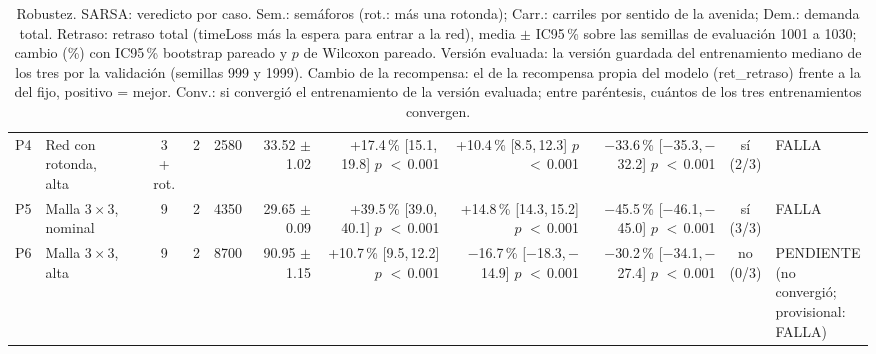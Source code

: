 \begin{table}[H]
\begin{tabular}{llcrrrrrrcl}
P4 & \makecell[l]{Red con\\{}rotonda,\\{}alta} & \makecell[c]{3\\{}+ rot.} & 2 & 2580 & \makecell[r]{33.52\\{}$\pm$ 1.02} & \makecell[r]{+17.4\,\%\\{}[15.1,\,19.8]\\$p$ $<$\,0.001} & \makecell[r]{+10.4\,\%\\{}[8.5,\,12.3]\\$p$ $<$\,0.001} & \makecell[r]{$-$33.6\,\%\\{}[$-$35.3,\,$-$32.2]\\$p$ $<$\,0.001} & \makecell[c]{sí\\{}(2/3)} & FALLA \\
P5 & \makecell[l]{Malla $3 \times 3$,\\{}nominal} & 9 & 2 & 4350 & \makecell[r]{29.65\\{}$\pm$ 0.09} & \makecell[r]{+39.5\,\%\\{}[39.0,\,40.1]\\$p$ $<$\,0.001} & \makecell[r]{+14.8\,\%\\{}[14.3,\,15.2]\\$p$ $<$\,0.001} & \makecell[r]{$-$45.5\,\%\\{}[$-$46.1,\,$-$45.0]\\$p$ $<$\,0.001} & \makecell[c]{sí\\{}(3/3)} & FALLA \\
P6 & \makecell[l]{Malla $3 \times 3$,\\{}alta} & 9 & 2 & 8700 & \makecell[r]{90.95\\{}$\pm$ 1.15} & \makecell[r]{+10.7\,\%\\{}[9.5,\,12.2]\\$p$ $<$\,0.001} & \makecell[r]{$-$16.7\,\%\\{}[$-$18.3,\,$-$14.9]\\$p$ $<$\,0.001} & \makecell[r]{$-$30.2\,\%\\{}[$-$34.1,\,$-$27.4]\\$p$ $<$\,0.001} & \makecell[c]{no\\{}(0/3)} & \makecell[l]{PENDIENTE\\{}(no convergió;\\{}provisional:\\{}FALLA)} \\
\bottomrule
\end{tabular}
\caption[Robustez: veredicto de SARSA]{Robustez. SARSA: veredicto por caso. Sem.: semáforos (rot.: más una rotonda); Carr.: carriles por sentido de la avenida; Dem.: demanda total. Retraso: retraso total (timeLoss más la espera para entrar a la red), media $\pm$ IC95\,\% sobre las semillas de evaluación 1001 a 1030; cambio (\%) con IC95\,\% bootstrap pareado y $p$ de Wilcoxon pareado. Versión evaluada: la versión guardada del entrenamiento mediano de los tres por la validación (semillas 999 y 1999). Cambio de la recompensa: el de la recompensa propia del modelo (ret\_retraso) frente a la del fijo, positivo = mejor. Conv.: si convergió el entrenamiento de la versión evaluada; entre paréntesis, cuántos de los tres entrenamientos convergen.}
\label{tab:robustez-veredicto-sarsa}
\end{table}
